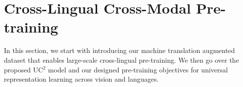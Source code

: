 \documentclass[final]{cvpr}
\newcommand{\jj}[1]{\textcolor{red}{\small{\bf [JJ: #1 ]}}}
\newcommand{\linjie}[1]{\textcolor{asparagus}{\small{\bf [Linjie: #1 ]}}}
\begin{document}

\section{Cross-Lingual Cross-Modal Pre-training}

In this section, we start with introducing our machine translation augmented dataset that enables large-scale cross-lingual pre-training. We then go over the proposed UC$^2$ model and our designed pre-training objectives for universal representation learning across vision and languages. 


\end{document}
